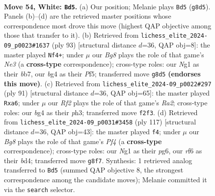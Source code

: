 \documentclass[11pt]{article}
\begin{document}
\clearpage

\begin{figure}[p]\centering
\begin{subfigure}{0.46\textwidth}\centering
\resizebox{\linewidth}{!}{%
\newchessgame
\chessboard[
  setfen={6B1/4k3/5r2/B7/P5bp/1PK2p2/5R2/6N1 w - - 2 54},
  showmover=false,
  pgfstyle=straightmove, color=movearrow, markmove={g8-d5}
]}
\caption{}
\end{subfigure}\hfill
\begin{subfigure}{0.46\textwidth}\centering
\resizebox{\linewidth}{!}{%
\newchessgame
\chessboard[
  setfen={R7/PB6/4n1pk/5p2/4p3/8/5PK1/r7 b - - 0 47},
  showmover=false,
  pgfstyle=straightmove, color=movearrow, markmove={e6-f4}
]}
\caption{}
\end{subfigure}
\\[4pt]
\begin{subfigure}{0.46\textwidth}\centering
\resizebox{\linewidth}{!}{%
\newchessgame
\chessboard[
  setfen={8/r5kp/P7/2n3p1/3b2P1/7P/R6B/7K b - - 5 46},
  showmover=false,
  pgfstyle=straightmove, color=movearrow, markmove={a7-a6}
]}
\caption{}
\end{subfigure}\hfill
\begin{subfigure}{0.46\textwidth}\centering
\resizebox{\linewidth}{!}{%
\newchessgame
\chessboard[
  setfen={r7/P3k3/6P1/1p3p2/1bpB3P/3p1K2/8/R7 b - - 2 59},
  showmover=false,
  pgfstyle=straightmove, color=movearrow, markmove={f5-f4}
]}
\caption{}
\end{subfigure}
\caption{\textbf{Move 54, White: \texttt{Bd5}.} (a) Our position; Melanie plays \texttt{Bd5} (\texttt{g8d5}). Panels (b)--(d) are the retrieved master positions whose correspondence most drove this move (highest QAP objective among those that transfer to it). (b) Retrieved from \texttt{lichess\_elite\_2024-09\_p0023\#1637} (ply 93) [structural distance $d$=36, QAP obj=8]: the master played \texttt{Nf4+}; under $\mu$ our \emph{Bg8} plays the role of that game's \emph{Ne3} (a \textbf{cross-type} correspondence); cross-type roles: our \emph{N}g1 as their \emph{b}b7, our \emph{b}g4 as their \emph{P}f5; transferred move \texttt{g8d5} \textbf{(endorses this move)}. (c) Retrieved from \texttt{lichess\_elite\_2024-09\_p0022\#297} (ply 91) [structural distance $d$=36, QAP obj=65]: the master played \texttt{Rxa6}; under $\mu$ our \emph{Rf2} plays the role of that game's \emph{Ra2}; cross-type roles: our \emph{b}g4 as their \emph{p}h3; transferred move \texttt{f2f3}. (d) Retrieved from \texttt{lichess\_elite\_2024-09\_p0031\#3458} (ply 117) [structural distance $d$=36, QAP obj=43]: the master played \texttt{f4}; under $\mu$ our \emph{Bg8} plays the role of that game's \emph{Pf4} (a \textbf{cross-type} correspondence); cross-type roles: our \emph{N}g1 as their \emph{p}g6, our \emph{r}f6 as their \emph{b}d4; transferred move \texttt{g8f7}. Synthesis: 1 retrieved analog transferred to \texttt{Bd5} (summed QAP objective 8, the strongest correspondence among the candidate moves); Melanie committed it via the \texttt{search} selector.}
\label{fig:thought-m106}
\end{figure}
\end{document}
